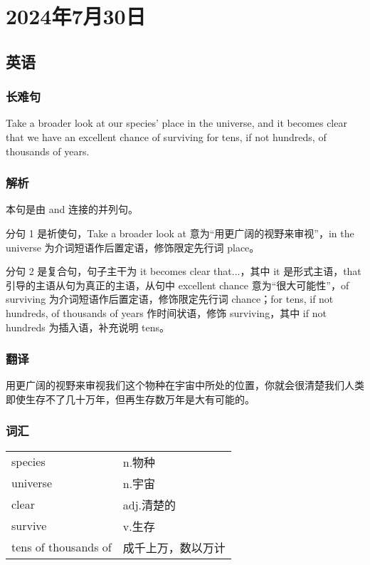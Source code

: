 \documentclass[UTF8]{ctexart}
\begin{document}
\section{2024年7月30日}
\subsection{英语}
\subsubsection{长难句}
Take a broader look at our species' place in the universe, and it becomes clear that we have an excellent chance of surviving for tens, if not hundreds, of thousands of years.
\subsubsection{解析}
本句是由 and 连接的并列句。

分句 1 是祈使句，Take a broader look at 意为“用更广阔的视野来审视”，in the universe 为介词短语作后置定语，修饰限定先行词 place。

分句 2 是复合句，句子主干为 it becomes clear that...，其中 it 是形式主语，that 引导的主语从句为真正的主语，从句中 excellent chance 意为“很大可能性”，of surviving 为介词短语作后置定语，修饰限定先行词 chance；for tens, if not hundreds, of thousands of years 作时间状语，修饰 surviving，其中 if not hundreds 为插入语，补充说明 tens。
\subsubsection{翻译}
用更广阔的视野来审视我们这个物种在宇宙中所处的位置，你就会很清楚我们人类即使生存不了几十万年，但再生存数万年是大有可能的。
\subsubsection{词汇}
\begin{table}[h]
      \centering
      \begin{tabular}{p{}p{}}
            species              & n.物种      \\
            universe             & n.宇宙      \\
            clear                & adj.清楚的   \\
            survive              & v.生存      \\
            tens of thousands of & 成千上万，数以万计
      \end{tabular}
\end{table}
\end{document}
